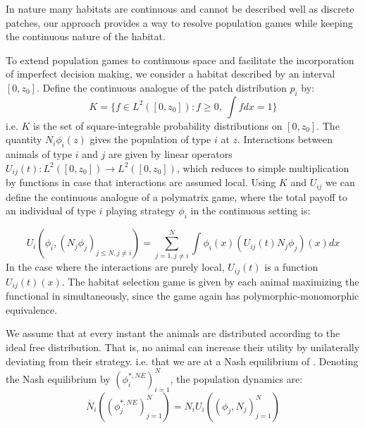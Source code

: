 In nature many habitats are continuous and cannot be described well as discrete patches, our approach provides a way to resolve population games while keeping the continuous nature of the habitat.

To extend population games to continuous space and facilitate the incorporation of imperfect decision making, we consider a habitat described by an interval $[0,z_0]$. Define the continuous analogue of the patch distribution $p_i$ by:
\begin{equation}
  K = \{ f \in L^2([0,z_0]) : f \geq 0,~\int f dx = 1\}
  \label{def:space_of_dists}
\end{equation}
i.e. $K$ is the set of square-integrable probability distributions on $[0,z_0]$. The quantity $N_i \phi_i(z)$ gives the population of type $i$ at $z$. Interactions between animals of type $i$ and $j$ are given by linear operators $U_{ij}(t): L^2([0,z_0]) \to L^2([0,z_0])$, which reduces to simple multiplication by functions in case that interactions are assumed local. Using $K$ and $U_{ij}$ we can define the continuous analogue of a polymatrix game, where the total payoff to an individual of type $i$ playing strategy $\phi_i$ in the continuous setting is:

\begin{equation}
  U_i(\phi_i, (N_j \phi_j)_{j \leq N, j \neq i}) = \sum_{j=1,j\neq i}^N \int \phi_i(x) (U_{ij}(t)N_j \phi_j)(x) dx%
  \label{eq:utility}
\end{equation}
In the case where the interactions are purely local, $U_{ij}(t)$ is a function $U_{ij}(t)(x)$. The habitat selection game is given by each animal maximizing the functional in  simultaneously, since the game again has polymorphic-monomorphic equivalence.

We assume that at every instant the animals are distributed according to the ideal free distribution. That is, no animal can increase their utility by unilaterally deviating from their strategy. i.e. that we are at a Nash equilibrium of . Denoting the Nash equilibrium by $(\phi_i^{*,NE})^N_{i=1}$, the population dynamics are:
\begin{equation}
  \dot{N_i}((\phi_j^{*,NE})_{j=1}^N ) = N_i U_i((\phi_j, N_j)_{j=1}^N)
\end{equation}

